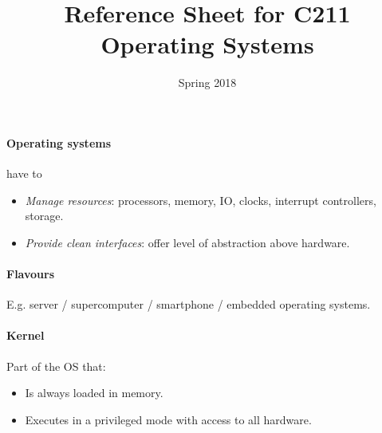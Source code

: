 \documentclass[twocolumn,english]{article}
\begin{document}
\title{Reference Sheet for C211 Operating Systems}

\date{Spring 2018}
\maketitle

\paragraph{Operating systems}

have to
\begin{itemize}
\item \emph{Manage resources}: processors, memory, IO, clocks, interrupt
controllers, storage.
\item \emph{Provide clean interfaces}: offer level of abstraction above
hardware.
\end{itemize}

\paragraph{Flavours}

E.g. server / supercomputer / smartphone / embedded operating systems.

\paragraph{Kernel}

Part of the OS that:
\begin{itemize}
\item Is always loaded in memory.
\item Executes in a privileged mode with access to all hardware.
\end{itemize}
\end{document}
